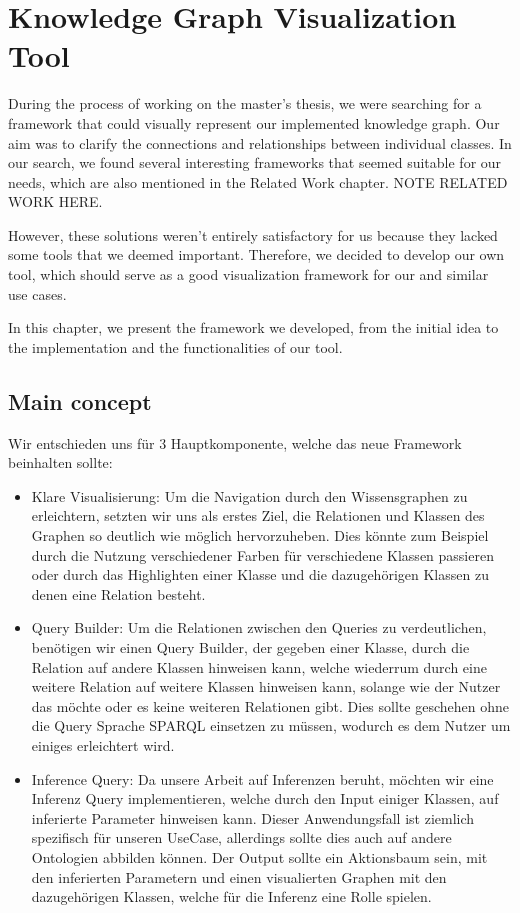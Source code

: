 \chapter*{Knowledge Graph Visualization Tool}
During the process of working on the master's thesis, we were searching for a framework that could visually represent our implemented knowledge graph. Our aim was to clarify the connections and relationships between individual classes. In our search, we found several interesting frameworks that seemed suitable for our needs, which are also mentioned in the Related Work chapter. NOTE RELATED WORK HERE.

However, these solutions weren't entirely satisfactory for us because they lacked some tools that we deemed important. Therefore, we decided to develop our own tool, which should serve as a good visualization framework for our and similar use cases.

In this chapter, we present the framework we developed, from the initial idea to the implementation and the functionalities of our tool.

\section*{Main concept}

Wir entschieden uns für 3 Hauptkomponente, welche das neue Framework beinhalten sollte:
\begin{itemize}
    \item Klare Visualisierung: Um die Navigation durch den Wissensgraphen zu erleichtern, setzten wir uns als erstes Ziel, die Relationen und Klassen des Graphen so deutlich wie möglich hervorzuheben. Dies könnte zum Beispiel durch die Nutzung verschiedener Farben für verschiedene Klassen passieren oder durch das Highlighten einer Klasse und die dazugehörigen Klassen zu denen eine Relation besteht.
    \item Query Builder: Um die Relationen zwischen den Queries zu verdeutlichen, benötigen wir einen Query Builder, der gegeben einer Klasse, durch die Relation auf andere Klassen hinweisen kann, welche wiederrum durch eine weitere Relation auf weitere Klassen hinweisen kann, solange wie der Nutzer das möchte oder es keine weiteren Relationen gibt. Dies sollte geschehen ohne die Query Sprache SPARQL einsetzen zu müssen, wodurch es dem Nutzer um einiges erleichtert wird.
    \item Inference Query: Da unsere Arbeit auf Inferenzen beruht, möchten wir eine Inferenz Query implementieren, welche durch den Input einiger Klassen, auf inferierte Parameter hinweisen kann. Dieser Anwendungsfall ist ziemlich spezifisch für unseren UseCase, allerdings sollte dies auch auf andere Ontologien abbilden können. Der Output sollte ein Aktionsbaum sein, mit den inferierten Parametern und einen visualierten Graphen mit den dazugehörigen Klassen, welche für die Inferenz eine Rolle spielen.
\end{itemize}

